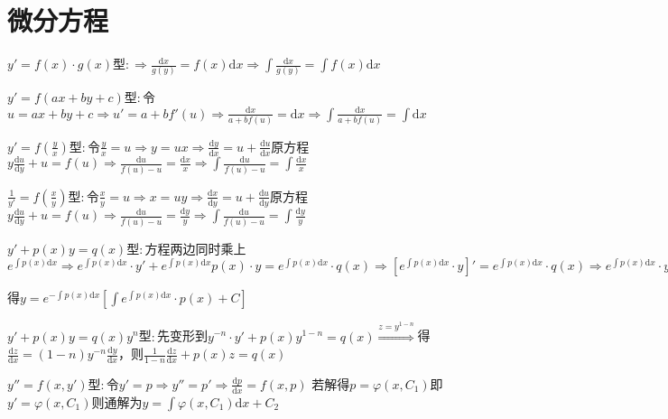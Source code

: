 \section{微分方程}

\begin{spacing}{\hangju}
    \LARGE
    $ y' = f(x) \cdot g(x)$型$\colon \Rightarrow \frac{\mathrm{d}x}{g(y)} = f(x)\mathrm{d}x \Rightarrow \int{\frac{\mathrm{d}x}{g(y)}} = \int{f(x)}\mathrm{d}x $

    $y' = f(ax + by + c)$型$\colon$令$u = ax +by + c \Rightarrow u' = a + bf'(u) \Rightarrow \frac{\mathrm{d}x}{a + bf(u)} = \mathrm{d}x \Rightarrow \int{\frac{\mathrm{d}x}{a + bf(u)}} = \int\mathrm{d}x$

    $y' = f(\frac{y}{x})$型$\colon$令$\frac{y}{x} = u \Rightarrow y = ux \Rightarrow \frac{\mathrm{d}y}{\mathrm{d}x} = u + \frac{\mathrm{d}u}{\mathrm{d}x}$原方程$y\frac{\mathrm{d}u}{\mathrm{d}y} + u = f(u) \Rightarrow \frac{\mathrm{d}u}{f(u)-u} = \frac{\mathrm{d}x}{x} \Rightarrow \int{\frac{\mathrm{d}u}{f(u)-u}} = \int{\frac{\mathrm{d}x}{x}}$

    $\frac{1}{y'} = f(\frac{x}{y})$型$\colon$令$\frac{x}{y} = u \Rightarrow x = uy \Rightarrow \frac{\mathrm{d}x}{\mathrm{d}y} = u + \frac{\mathrm{d}u}{\mathrm{d}y}$原方程$y\frac{\mathrm{d}u}{\mathrm{d}y} + u = f(u) \Rightarrow \frac{\mathrm{d}u}{f(u)-u} = \frac{\mathrm{d}y}{y} \Rightarrow \int{\frac{\mathrm{d}u}{f(u)-u}} = \int{\frac{\mathrm{d}y}{y}}$

    $y' + p(x)y = q(x)$型$\colon$方程两边同时乘上$e^{\int{p(x)\mathrm{d}x}} \Rightarrow e^{\int{p(x)\mathrm{d}x}} \cdot y' + e^{\int{p(x)\mathrm{d}x}}p(x) \cdot y = e^{\int{p(x)\mathrm{d}x}} \cdot q(x) \Rightarrow \left[e^{\int{p(x)\mathrm{d}x}} \cdot y\right]' = e^{\int{p(x)\mathrm{d}x}} \cdot q(x) \Rightarrow e^{\int{p(x)\mathrm{d}x}} \cdot y = \int{e^{\int{p(x)\mathrm{d}x}} \cdot q(x)}\mathrm{d}x + C$

    \noindent 得$y = e^{-\int{p(x)\mathrm{d}x}}\left[\int{e^{\int{p(x)\mathrm{d}x}} \cdot p(x)} + C\right]$

    $y' + p(x)y = q(x)y^n$型$\colon$先变形到$y^{-n} \cdot y' + p(x)y^{1-n} = q(x) \stackrel{z = y^{1-n}}{\Longrightarrow}$得$\frac{\mathrm{d}z}{\mathrm{d}x} = (1 - n)y^{-n}\frac{\mathrm{d}y}{\mathrm{d}x}$，则$\frac{1}{1 - n}\frac{\mathrm{d}z}{\mathrm{d}x} + p(x)z = q(x)$

    $y''=f(x, y')$型$\colon$令$y' = p \Rightarrow y'' = p' \Rightarrow \frac{\mathrm{d}p}{\mathrm{d}x} = f(x, p)$
    若解得$p = \varphi(x, C_1)$即$y' = \varphi(x, C_1)$则通解为$y = \int{\varphi(x, C_1)\mathrm{d}x} +C_2$


\end{spacing}

